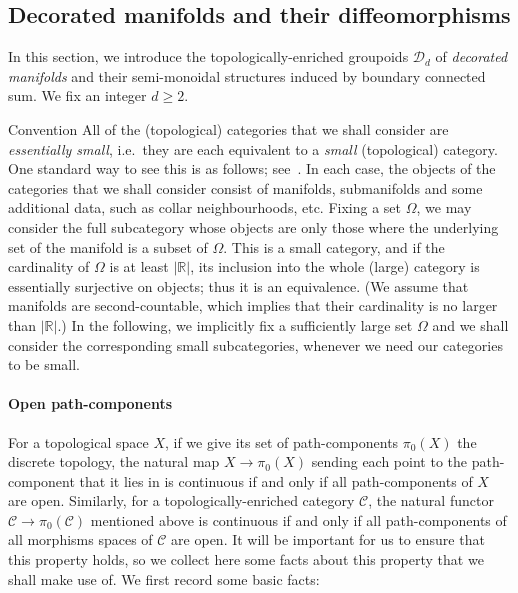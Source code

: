 \documentclass[AHL,Unicode,published]{cedram}
\newcommand{\cC}{\mathcal{C}}
\newcommand{\cD}{\mathcal{D}}
\newcommand{\bR}{\mathbb{R}}
\renewcommand{\geq}{\geqslant}
\begin{document}
\subsection{Decorated manifolds and their diffeomorphisms}\label{ss:topological_groupoids_of_decorated_manifolds}

In this section, we introduce the topologically-enriched groupoids $\cD_{d}$ of \emph{decorated manifolds} and their semi-monoidal structures induced by boundary connected sum. We fix an integer $d \geq 2$.

\begin{enonce}{Convention}\label{convention:small_categories}
All of the (topological) categories that we shall consider are \emph{essentially small}, i.e.~they are each equivalent to a \emph{small} (topological) category. One standard way to see this is as follows; see~\cite[Rem.~1.2.7]{Galatius}. In each case, the objects of the categories that we shall consider consist of manifolds, submanifolds and some additional data, such as collar neighbourhoods, etc. Fixing a set $\Omega$, we may consider the full subcategory whose objects are only those where the underlying set of the manifold is a subset of $\Omega$. This is a small category, and if the cardinality of $\Omega$ is at least $| \bR |$, its inclusion into the whole (large) category is essentially surjective on objects; thus it is an equivalence. (We assume that manifolds are second-countable, which implies that their cardinality is no larger than $| \bR |$.) In the following, we implicitly fix a sufficiently large set $\Omega$ and we shall consider the corresponding small subcategories, whenever we need our categories to be small.
\end{enonce}


\paragraph*{Open path-components}
For a topological space $X$, if we give its set of path-components $\pi_0(X)$ the discrete topology, the natural map $X \to \pi_0(X)$ sending each point to the path-component that it lies in is continuous if and only if all path-components of $X$ are open. Similarly, for a topologically-enriched category $\cC$, the natural functor $\cC \to \pi_0(\cC)$ mentioned above is continuous if and only if all path-components of all morphisms spaces of $\cC$ are open. It will be important for us to ensure that this property holds, so we collect here some facts about this property that we shall make use of. We first record some basic facts:
\end{document}

